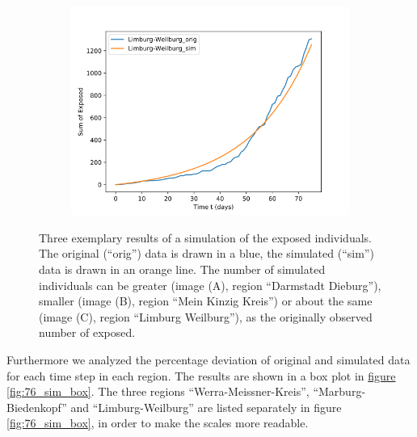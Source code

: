 \begin{figure}
\begin{subfigure}[b]{0.3\textwidth}
		\includegraphics[width=\textwidth]{./figures/10_Limburg-Weilburg.png}	
		\caption{}
	\end{subfigure}
	\caption{Three exemplary results of a simulation of the exposed individuals.
		The original (``orig'') data is drawn in a blue, the simulated (``sim'') data is drawn in an orange line.
		The number of simulated individuals can be greater (image (A), region ``Darmstadt Dieburg''), smaller 
		(image (B), region ``Mein Kinzig Kreis'') or about the same (image (C), region ``Limburg Weilburg''), as 
		the originally observed number of exposed.
		}
	\label{fig:76_sim_expl}
\end{figure}

Furthermore we analyzed the percentage deviation of original and simulated data for each time step in each region. The results
are shown in a box plot in \hyperref[fig:76_sim_box]{figure \ref*{fig:76_sim_box}}. The three regions ``Werra-Meissner-Kreis'',
``Marburg-Biedenkopf'' and ``Limburg-Weilburg'' are listed separately in figure \ref*{fig:76_sim_box}, in order to make the scales
more readable.


